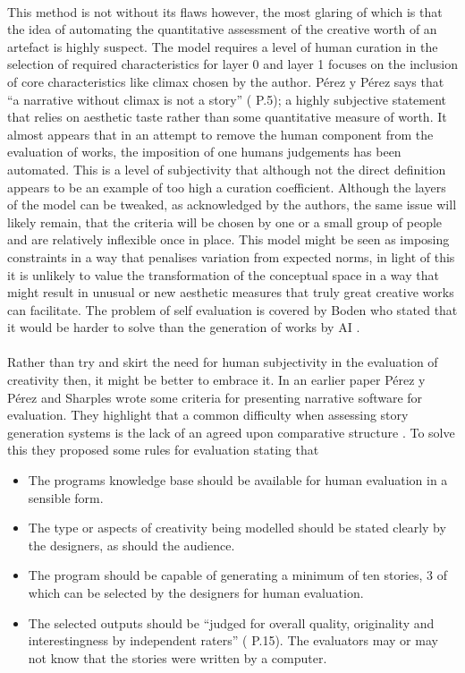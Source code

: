 \documentclass[letterpaper]{article}
\begin{document}
\\This method is not without its flaws however, the most glaring of which is that the idea of automating the quantitative assessment of the creative worth of an artefact is highly suspect. The model requires a level of human curation in the selection of required characteristics for layer 0 and layer 1 focuses on the inclusion of core characteristics like climax chosen by the author. P\'erez y P\'erez says that \enquote{a narrative without climax is not a story} (\citeauthor{y2014three} \citeyear{y2014three} P.5); a highly subjective statement that relies on aesthetic taste rather than some quantitative measure of worth. It almost appears that in an attempt to remove the human component from the evaluation of works, the imposition of one humans judgements has been automated. This is a level of subjectivity that although not the direct definition appears to be an example of too high a curation coefficient. Although the layers of the model can be tweaked, as acknowledged by the authors, the same issue will likely remain, that the criteria will be chosen by one or a small group of people and are relatively inflexible once in place. This model might be seen as imposing constraints in a way that penalises variation from expected norms, in light of this it is unlikely to value the transformation of the conceptual space in a way that might result in unusual or new aesthetic measures that truly great creative works can facilitate. The problem of self evaluation is covered by Boden who stated that it would be harder to solve than the generation of works by AI \cite{BODEN1998347}.\\
\\Rather than try and skirt the need for human subjectivity in the evaluation of creativity then, it might be better to embrace it. In an earlier paper P\'erez y P\'erez and Sharples wrote some criteria for presenting narrative software for evaluation. They highlight that a common difficulty when assessing story generation systems is the lack of an agreed upon comparative structure \cite{PEREZYPEREZ200415}. To solve this they proposed some rules for evaluation stating that
\begin{itemize}
\item The programs knowledge base should be available for human evaluation in a sensible form.
\item The type or aspects of creativity being modelled should be stated clearly by the designers, as should the audience.
\item The program should be capable of generating a minimum of ten stories, 3 of which can be selected by the designers for human evaluation.
\item The selected outputs should be \enquote{judged for overall quality, originality and interestingness by independent raters} (\citeauthor{PEREZYPEREZ200415} \citeyear{PEREZYPEREZ200415} P.15). The evaluators may or may not know that the stories were written by a computer.
\end{itemize}
\end{document}
